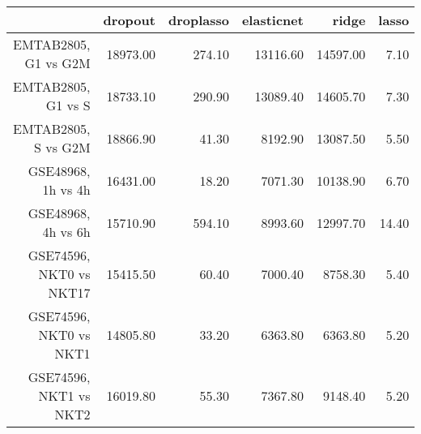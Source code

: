 \begin{table}[ht]
\centering
\begin{tabular}{rrrrrr}
  \hline
 & dropout & droplasso & elasticnet & ridge & lasso \\ 
  \hline
EMTAB2805, G1 vs G2M & 18973.00 & 274.10 & 13116.60 & 14597.00 & 7.10 \\ 
  EMTAB2805, G1 vs S & 18733.10 & 290.90 & 13089.40 & 14605.70 & 7.30 \\ 
  EMTAB2805, S vs G2M & 18866.90 & 41.30 & 8192.90 & 13087.50 & 5.50 \\ 
  GSE48968, 1h vs 4h & 16431.00 & 18.20 & 7071.30 & 10138.90 & 6.70 \\ 
  GSE48968, 4h vs 6h & 15710.90 & 594.10 & 8993.60 & 12997.70 & 14.40 \\ 
  GSE74596, NKT0 vs NKT17 & 15415.50 & 60.40 & 7000.40 & 8758.30 & 5.40 \\ 
  GSE74596, NKT0 vs NKT1 & 14805.80 & 33.20 & 6363.80 & 6363.80 & 5.20 \\ 
  GSE74596, NKT1 vs NKT2 & 16019.80 & 55.30 & 7367.80 & 9148.40 & 5.20 \\ 
   \hline
\end{tabular}
\end{table}
